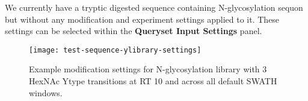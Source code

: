 \documentclass[../manual.tex]{subfiles}
\begin{document}
We currently have a tryptic digested sequence containing N-glycosylation sequon but without any modification and experiment settings applied to it. These settings can be selected within the \textbf{Queryset Input Settings} panel.\par


\begin{figure}[h]
	\centering
	\begin{framed}
        \centering
        \begin{adjustbox}{width=1\textwidth}
			\texttt{[image: test-sequence-ylibrary-settings]}
		\end{adjustbox}
		\caption{Example modification settings for N-glycosylation library with 3 HexNAc Ytype transitions at RT 10 and across all default SWATH windows.}\label{fig:testsequenceylibrarysettings}
	\end{framed}
\end{figure}
\end{document}
